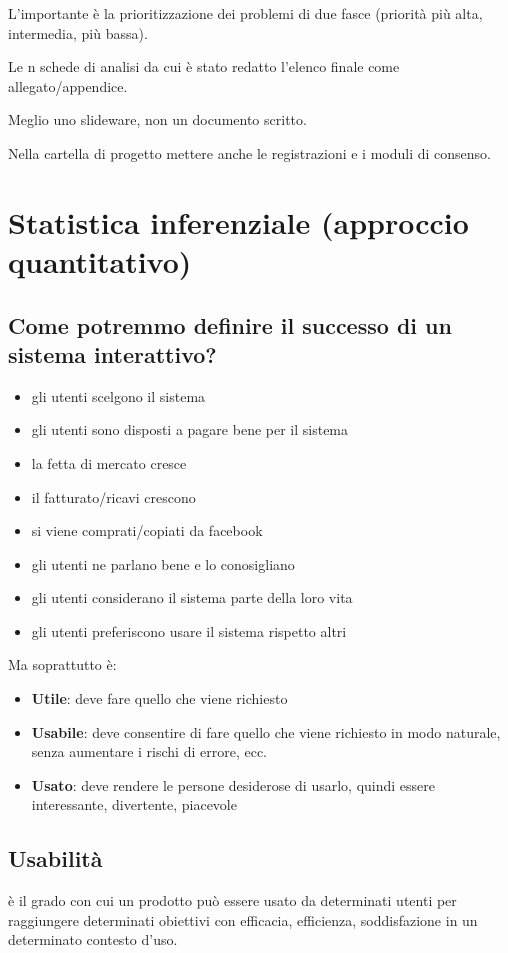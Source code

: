 \documentclass[11pt,a4paper]{book}
\begin{document}
L'importante è la prioritizzazione dei problemi di due fasce (priorità più alta, intermedia, più bassa).

Le n schede di analisi da cui è stato redatto l'elenco finale come allegato/appendice.

Meglio uno slideware, non un documento scritto.

Nella cartella di progetto mettere anche le registrazioni e i moduli di consenso.

\section{Statistica inferenziale (approccio quantitativo)}
\subsection{Come potremmo definire il successo di un sistema interattivo?}
\begin{itemize}
	\item gli utenti scelgono il sistema
	\item gli utenti sono disposti a pagare bene per il sistema
	\item la fetta di mercato cresce
	\item il fatturato/ricavi crescono
	\item si viene comprati/copiati da facebook
	\item gli utenti ne parlano bene e lo conosigliano
	\item gli utenti considerano il sistema parte della loro vita
	\item gli utenti preferiscono usare il sistema rispetto altri
\end{itemize}

Ma soprattutto è:
\begin{itemize}
	\item \textbf{Utile}: deve fare quello che viene richiesto
	\item \textbf{Usabile}: deve consentire di fare quello che viene richiesto in modo naturale, senza aumentare i rischi di errore, ecc.
	\item \textbf{Usato}: deve rendere le persone desiderose di usarlo, quindi essere interessante, divertente, piacevole
\end{itemize}

\subsection{Usabilità}
è il grado con cui un prodotto può essere usato da determinati utenti per raggiungere determinati obiettivi con efficacia, efficienza, soddisfazione in un determinato contesto d'uso.
\end{document}
